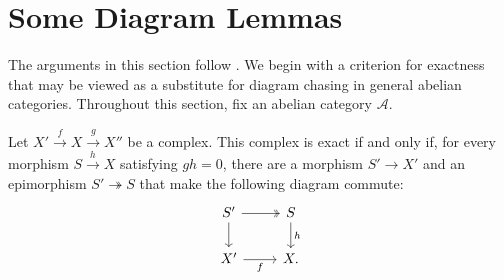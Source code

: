
\section{Some Diagram Lemmas}\label{sec:diagram-lemmas}
\hypertarget{o014.aljabr2.chapter2.diagram-lemmas}{ }

The arguments in this section follow \cite[Chapters 8 and 12]{KS06}. We begin
with a criterion for exactness that may be viewed as a substitute for diagram
chasing \cite[\S~6.8]{Li1} in general abelian categories. Throughout this
section, fix an abelian category $\mathcal{A}$.

\begin{lemma}\label{prop:Abel-cat-exact-aux}
	Let $X'\xrightarrow{f}X\xrightarrow{g}X''$ be a complex. This complex is
	exact if and only if, for every morphism $S\xrightarrow{h}X$ satisfying
	$gh=0$, there are a morphism $S'\to X'$ and an epimorphism
	$S'\twoheadrightarrow S$ that make the following diagram commute:
	\[\begin{tikzcd}
		S' \arrow[twoheadrightarrow, r] \arrow[d] & S \arrow[d, "h"] \\
		X' \arrow[r, "f"'] & X .
	\end{tikzcd}\]
\end{lemma}

